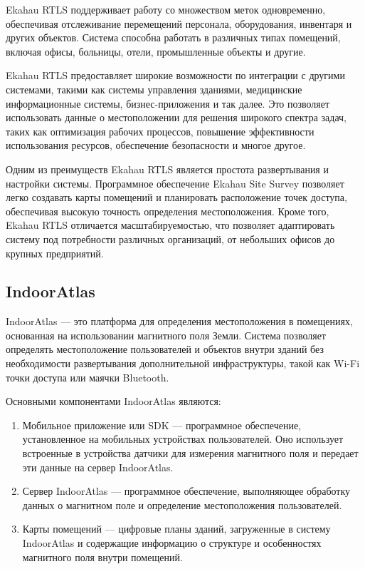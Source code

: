 Ekahau RTLS поддерживает работу со множеством меток одновременно, обеспечивая отслеживание перемещений персонала, оборудования, инвентаря и других объектов. Система способна работать в различных типах помещений, включая офисы, больницы, отели, промышленные объекты и другие.

Ekahau RTLS предоставляет широкие возможности по интеграции с другими системами, такими как системы управления зданиями, медицинские информационные системы, бизнес-приложения и так далее. Это позволяет использовать данные о местоположении для решения широкого спектра задач, таких как оптимизация рабочих процессов, повышение эффективности использования ресурсов, обеспечение безопасности и многое другое.

Одним из преимуществ Ekahau RTLS является простота развертывания и настройки системы. Программное обеспечение Ekahau Site Survey позволяет легко создавать карты помещений и планировать расположение точек доступа, обеспечивая высокую точность определения местоположения. Кроме того, Ekahau RTLS отличается масштабируемостью, что позволяет адаптировать систему под потребности различных организаций, от небольших офисов до крупных предприятий.

\subsection{IndoorAtlas}

IndoorAtlas --- это платформа для определения местоположения в помещениях, основанная на использовании магнитного поля Земли. Система позволяет определять местоположение пользователей и объектов внутри зданий без необходимости развертывания дополнительной инфраструктуры, такой как Wi-Fi точки доступа или маячки Bluetooth.

Основными компонентами IndoorAtlas являются:

\begin{enumerate}
    \item Мобильное приложение или SDK --- программное обеспечение, установленное на мобильных устройствах пользователей. Оно использует встроенные в устройства датчики для измерения магнитного поля и передает эти данные на сервер IndoorAtlas.
    \item Сервер IndoorAtlas --- программное обеспечение, выполняющее обработку данных о магнитном поле и определение местоположения пользователей.
    \item Карты помещений --- цифровые планы зданий, загруженные в систему IndoorAtlas и содержащие информацию о структуре и особенностях магнитного поля внутри помещений.
\end{enumerate}

